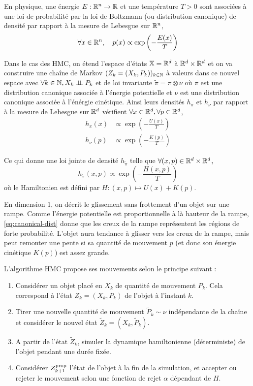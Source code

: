 \documentclass[10pt,a4paper]{article}
\begin{document}
\begin{Def}
	En physique, une énergie $E : \mathbb{R}^n \to \mathbb{R}$ et une température $T > 0$ sont associées à une loi de probabilité par la loi de Boltzmann (ou distribution canonique) de densité par rapport à la mesure de Lebesgue sur $\mathbb{R}^n$,
	$$\forall x \in \mathbb{R}^n,  \quad p(x) \propto \exp \left( -\frac{E(x)}{T} \right)$$
\end{Def}


Dans le cas des HMC, on étend l'espace d'états $\mathbb{X} = \mathbb{R}^d$ à $\mathbb{R}^d \times \mathbb{R}^d$ et on va construire une chaîne de Markov $(Z_k = (X_k, P_k))_{k \in \mathbb{N}}$ à valeurs dans ce nouvel espace avec $\forall k \in \mathbb{N}, X_k \perp\!\!\!\perp P_k$ et de loi invariante $\widetilde{\pi} = \pi \otimes \nu$ où $\pi$ est une distribution canonique associée à l'énergie potentielle et $\nu$ est une distribution canonique associée à l'énérgie cinétique. Ainsi leurs densités $h_\pi$ et $h_\nu$ par rapport à la mesure de Lebesgue sur $\mathbb{R}^d$ vérifient $\forall x \in \mathbb{R}^d, \forall p \in \mathbb{R}^d$,
\begin{align*}
	h_\pi(x) & \propto  \exp \left( -\frac{U(x)}{T} \right) \\
	h_\nu(p) & \propto  \exp \left( -\frac{K(p)}{T} \right)
\end{align*}

Ce qui donne une loi jointe de densité $h_{\widetilde{\pi}}$ telle que $\forall (x,p) \in \mathbb{R}^d \times \mathbb{R}^d$, 
\begin{equation} \label{eq:canonical-dist}
	h_{\widetilde{\pi}}(x,p) \propto \exp \left( -\frac{H(x,p)}{T} \right)
\end{equation}
où le Hamiltonien est défini par $H : (x,p) \mapsto U(x) + K(p)$.

\begin{Rque}
	En dimension 1, on décrit le glissement sans frottement d'un objet sur une rampe. Comme l'énergie potentielle est proportionnelle à là hauteur de la rampe, \eqref{eq:canonical-dist} donne que les creux de la rampe représentent les régions de forte probabilité. L'objet aura tendance à glisser vers les creux de la rampe, mais peut remonter une pente si sa quantité de mouvement $p$ (et donc son énergie cinétique $K(p)$) est assez grande.
\end{Rque}

L'algorithme HMC propose ses mouvements selon le principe suivant : 
\begin{enumerate}
	\item Considérer un objet placé en $X_k$ de quantité de mouvement $P_k$. Cela correspond à l'état $Z_k = (X_k, P_k)$ de l'objet à l'instant $k$.
	\item Tirer une nouvelle quantité de mouvement $\tilde{P}_k \sim \nu$ indépendante de la chaîne et considérer le nouvel état $\tilde{Z}_k = (X_k, \tilde{P}_k)$. 
	\item A partir de l'état $\tilde{Z}_k$, simuler la dynamique hamiltonienne (déterministe) de l'objet pendant une durée fixée.
	\item Considérer $Z_{k+1}^{\rm prop}$ l'état de l'objet à la fin de la simulation, et accepter ou rejeter le mouvement selon une fonction de rejet $\alpha$ dépendant de $H$. 
\end{enumerate}
\end{document}
